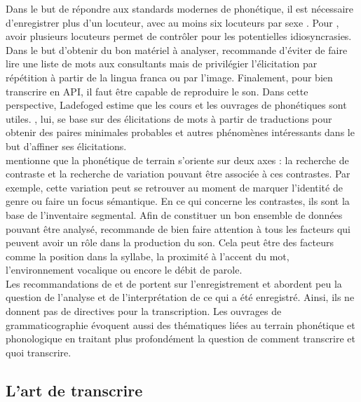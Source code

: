 Dans le but de répondre aux standards modernes de phonétique, il est nécessaire d'enregistrer plus d'un locuteur, avec au moins six locuteurs par sexe \parencite[15]{ladefogedPhoneticDataAnalysis2003}. Pour \textcite{maddiesonPhoneticFieldwork2001}, avoir plusieurs locuteurs permet de contrôler pour les potentielles idiosyncrasies. Dans le but d'obtenir du bon matériel à analyser, \textcite{ladefogedPhoneticDataAnalysis2003} recommande d'éviter de faire lire une liste de mots aux consultants mais de privilégier l'élicitation par répétition à partir de la lingua franca ou par l'image. Finalement, pour bien transcrire en API, il faut être capable de reproduire le son. Dans cette perspective, Ladefoged estime que les cours et les ouvrages de phonétiques sont utiles. \textcite{maddiesonPhoneticFieldwork2001}, lui, se base sur des élicitations de mots à partir de traductions pour obtenir des paires minimales probables et autres phénomènes intéressants dans le but d'affiner ses élicitations.\\

\textcite[218]{maddiesonPhoneticFieldwork2001} mentionne  que la phonétique de terrain s'oriente sur deux axes : la recherche de contraste et la recherche de variation pouvant être associée à ces contrastes. Par exemple, cette variation peut se retrouver au moment de marquer l'identité de genre ou faire un focus sémantique. En ce qui concerne les contrastes, ils sont la base de l'inventaire segmental. Afin de constituer un bon ensemble de données pouvant être analysé, \textcite[220]{maddiesonPhoneticFieldwork2001} recommande de bien faire attention à tous les facteurs qui peuvent avoir un rôle dans la production du son. Cela peut être des facteurs comme la position dans la syllabe, la proximité à l'accent du mot, l’environnement vocalique ou encore le débit de parole.\\

Les recommandations de \textcite{ladefogedPhoneticDataAnalysis2003} et de \textcite{maddiesonPhoneticFieldwork2001} portent sur l'enregistrement et abordent peu la question de l'analyse et de l'interprétation de ce qui a été enregistré. Ainsi, ils ne donnent pas de directives pour la transcription. Les ouvrages de grammaticographie évoquent aussi des thématiques liées au terrain phonétique et phonologique en traitant plus profondément la question de comment transcrire et quoi transcrire.

\subsection{L'art de transcrire}

